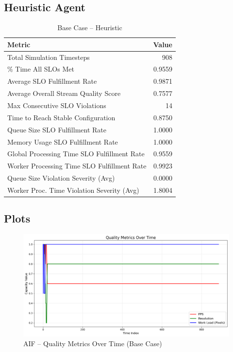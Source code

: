 \subsection*{Heuristic Agent}
\begin{table}[h]
\centering
\caption{Base Case – Heuristic}
\label{tab:base_heuristic}
\begin{tabular}{lr}
\toprule
Metric & Value \\
\midrule
Total Simulation Timesteps & 908 \\
\% Time All SLOs Met & 0.9559 \\
Average SLO Fulfillment Rate & 0.9871 \\
Average Overall Stream Quality Score & 0.7577 \\
Max Consecutive SLO Violations & 14 \\
Time to Reach Stable Configuration & 0.8750 \\
Queue Size SLO Fulfillment Rate & 1.0000 \\
Memory Usage SLO Fulfillment Rate & 1.0000 \\
Global Processing Time SLO Fulfillment Rate & 0.9559 \\
Worker Processing Time SLO Fulfillment Rate & 0.9923 \\
Queue Size Violation Severity (Avg) & 0.0000 \\
Worker Proc. Time Violation Severity (Avg) & 1.8004 \\
\bottomrule
\end{tabular}
\end{table}


\subsection*{Plots}

\begin{figure}[h]
    \centering
    \includegraphics[width=\textwidth]{img/results/basic_sim/active_inference_relative_control_quality_metrics.png}
    \caption{AIF – Quality Metrics Over Time (Base Case)}
\end{figure}

